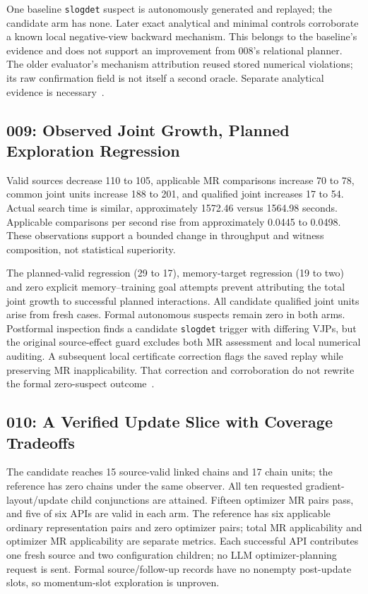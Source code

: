 \documentclass[conference]{IEEEtran}
\begin{document}
One baseline \texttt{slogdet} suspect is autonomously generated and replayed; the candidate arm has none. Later exact analytical and minimal controls corroborate a known local negative-view backward mechanism. This belongs to the baseline's evidence and does not support an improvement from 008's relational planner. The older evaluator's mechanism attribution reused stored numerical violations; its raw confirmation field is not itself a second oracle. Separate analytical evidence is necessary~\cite{rm008}.

\subsection{009: Observed Joint Growth, Planned Exploration Regression}
Valid sources decrease 110 to 105, applicable MR comparisons increase 70 to 78, common joint units increase 188 to 201, and qualified joint increases 17 to 54. Actual search time is similar, approximately 1572.46 versus 1564.98 seconds. Applicable comparisons per second rise from approximately 0.0445 to 0.0498. These observations support a bounded change in throughput and witness composition, not statistical superiority.

The planned-valid regression (29 to 17), memory-target regression (19 to two) and zero explicit memory--training goal attempts prevent attributing the total joint growth to successful planned interactions. All candidate qualified joint units arise from fresh cases. Formal autonomous suspects remain zero in both arms. Postformal inspection finds a candidate \texttt{slogdet} trigger with differing VJPs, but the original source-effect guard excludes both MR assessment and local numerical auditing. A subsequent local certificate correction flags the saved replay while preserving MR inapplicability. That correction and corroboration do not rewrite the formal zero-suspect outcome~\cite{rm009}.

\subsection{010: A Verified Update Slice with Coverage Tradeoffs}
The candidate reaches 15 source-valid linked chains and 17 chain units; the reference has zero chains under the same observer. All ten requested gradient-layout/update child conjunctions are attained. Fifteen optimizer MR pairs pass, and five of six APIs are valid in each arm. The reference has six applicable ordinary representation pairs and zero optimizer pairs; total MR applicability and optimizer MR applicability are separate metrics. Each successful API contributes one fresh source and two configuration children; no LLM optimizer-planning request is sent. Formal source/follow-up records have no nonempty post-update slots, so momentum-slot exploration is unproven.
\end{document}
